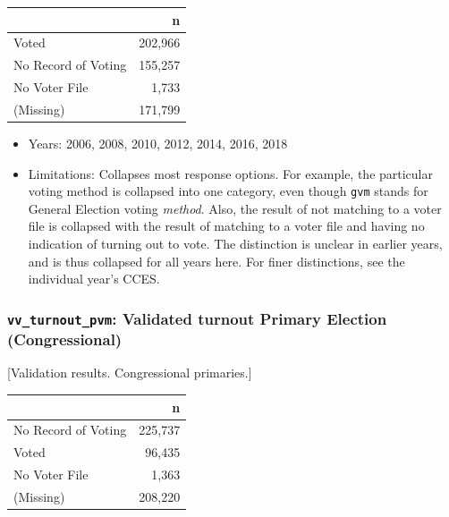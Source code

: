 \documentclass[10pt,article,oneside]{memoir}
\theoremstyle{definition}
\begin{document}
\begin{table}[H]
\centering
\begin{tabular}{lr}
\toprule
 & n\\
\midrule
Voted & 202,966\\
No Record of Voting & 155,257\\
No Voter File & 1,733\\
(Missing) & 171,799\\
\bottomrule
\end{tabular}
\end{table}

\begin{itemize}
\tightlist
\item
  Years: 2006, 2008, 2010, 2012, 2014, 2016, 2018
\item
  Limitations: Collapses most response options. For example, the
  particular voting method is collapsed into one category, even though
  \texttt{gvm} stands for General Election voting \emph{method}. Also,
  the result of not matching to a voter file is collapsed with the
  result of matching to a voter file and having no indication of turning
  out to vote. The distinction is unclear in earlier years, and is thus
  collapsed for all years here. For finer distinctions, see the
  individual year's CCES.
\end{itemize}

\hypertarget{vv_turnout_pvm-validated-turnout-primary-election-congressional}{%
\subsubsection{\texorpdfstring{\texttt{vv\_turnout\_pvm}: Validated
turnout Primary Election
(Congressional)}{vv\_turnout\_pvm: Validated turnout Primary Election (Congressional)}}\label{vv_turnout_pvm-validated-turnout-primary-election-congressional}}

{[}Validation results. Congressional primaries.{]}

\begin{table}[H]
\centering
\begin{tabular}{lr}
\toprule
 & n\\
\midrule
No Record of Voting & 225,737\\
Voted & 96,435\\
No Voter File & 1,363\\
(Missing) & 208,220\\
\bottomrule
\end{tabular}
\end{table}
\end{document}

